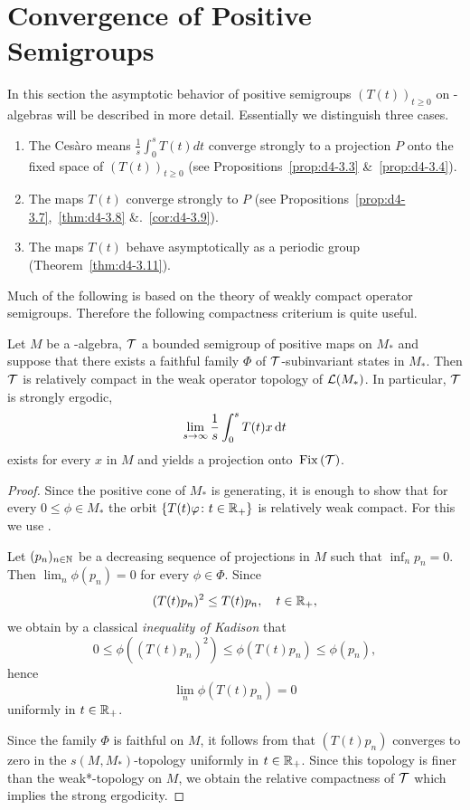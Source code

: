 \section{Convergence of Positive Semigroups}\label{sec:d4-3}
In this section the asymptotic behavior of positive semigroups $(T(t))_{t \geq 0}$ on \WA-algebras will be described in more detail.
Essentially we distinguish three cases.
\begin{enumerate}[\upshape (i), wide, labelindent=.25em]
\item
The Cesàro means $\frac{1}{s}\int_{0}^{s} T(t)dt$ converge strongly to a projection $P$ onto the fixed space of\/ $(T(t))_{t \geq 0}$ (see Propositions~\ref{prop:d4-3.3} \&~\ref{prop:d4-3.4}).

\item
The maps $T(t)$ converge strongly to $P$ (see Propositions~\ref{prop:d4-3.7},~\ref{thm:d4-3.8} \&.~\ref{cor:d4-3.9}).

\item
The maps $T(t)$ behave asymptotically as a periodic group (Theorem~\ref{thm:d4-3.11}).
\end{enumerate}
Much of the following is based on the theory of weakly compact operator semigroups.
Therefore the following compactness criterium is quite useful. 
\begin{proposition}\label{prop:d4-3.1}
Let $M$ be a \WA-algebra, $\mathcal{T}$ a bounded semigroup of positive maps on $M_{*}$ and suppose that there exists a faithful family $\Phi$ of\/ $\mathcal{T}$-subinvariant states in $M_{*}$.
Then $\mathcal{T}$ is relatively compact in the weak operator topology of\/ $ \mathcal{L}(M_{*}) $.
In particular, $\mathcal{T}$ is strongly ergodic, \ie 
%
\[
	\lim_{s \to \infty} \frac{1}{s}\int_{0}^{s} T(t)x \mathop{}\!\mathrm{d}{t}
\]
%
exists for every $x$ in $M$ and yields a projection onto $\mathop{}\mathrm{Fix}\left(\mathcal{T}\right)$.
\end{proposition}
%
\begin{proof}
Since the positive cone of\/ $M_{*}$ is generating, it is enough to show that for every $0 \leq \phi \in M_{*}$ the orbit $\{T(t)\phi \colon t \in \R_{+}\}$ is relatively weak compact.
For this we use \textcite[Theorem III.5.4.\,(iii)]{takesaki:1979}.

Let $(p_{n})_{n \in \mathbb{N}}$ be a decreasing sequence of projections in $M$ such that $\inf_{n} p_{n} = 0$.
Then $\lim_{n}\phi(p_{n}) = 0$ for every $\phi \in \Phi$.
Since
\[
	(T(t)p_{n})^2 \leq T(t)p_{n}, \quad t \in \R_{+},
\]
we obtain by a classical \emph{inequality of Kadison} that
\[
0 \leq \phi((T(t)p_{n})^2) \leq \phi(T(t)p_{n}) \leq \phi(p_{n}),
\]
hence 
%
\[
	\lim_{n}\phi(T(t)p_{n}) = 0
\]
%
uniformly in $t \in \mathbb{R}_{+}$.

Since the family $\Phi$ is faithful on $M$, it follows from \textcite[Proposition III.5.3]{takesaki:1979} that $(T(t)p_{n})$ converges to zero in the $s(M,M_{*})$-topology uniformly in $t \in \mathbb{R}_{+}$.
Since this topology is finer than the weak*-topology on $M$, we obtain the relative compactness of\/ $\mathcal{T}$ which implies the strong ergodicity.
\end{proof}
